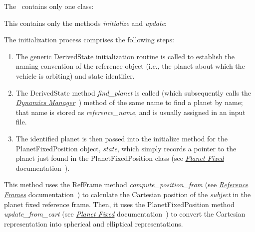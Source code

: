 The \PlanetaryDesc\ contains only one class:
\begin{itemize}

This contains only the methods \textit{initialize} and \textit{update}:
\begin{enumerate}
The initialization process comprises the following steps:
\begin{enumerate}
\item{} The generic DerivedState initialization routine is called to establish the naming convention of the reference object (i.e., the planet about which the vehicle is orbiting) and state identifier.
\item{} The DerivedState method \textit{find\_planet} is called (which subsequently calls the  \href{file:\JEODHOME/models/dynamics/dyn_manager/docs/dyn_manager.pdf}{\em Dynamics Manager}~\cite{dynenv:DYNMANAGER}) method of the same name to find a planet by name; that name is stored as \textit{reference\_name}, and is usually assigned in an input file.
\item{} The identified planet is then passed into the initialize method for the PlanetFixedPosition object, \textit{state}, which simply records a pointer to the planet just found in the PlanetFixedPosition class (see \href{file:\JEODHOME/models/utils/planet\_fixed/docs/planet\_fixed.pdf}{\em Planet Fixed} documentation~\cite{dynenv:PLANETFIXED}).
\end{enumerate}

This method uses the RefFrame method \textit{compute\_position\_from} (see \href{file:\JEODHOME/models/utils/ref\_frames/docs/ref\_frames.pdf}{\em Reference Frames} documentation~\cite{dynenv:REFFRAMES}) to calculate the Cartesian position of the \textit{subject} in the planet fixed reference frame.  Then, it uses the PlanetFixedPosition method \textit{update\_from\_cart} 
(see \href{file:\JEODHOME/models/utils/planet\_fixed/docs/planet\_fixed.pdf}{\em Planet Fixed} documentation~\cite{dynenv:PLANETFIXED}) 
to convert the Cartesian representation into spherical and elliptical representations.

\end{enumerate}
\end{itemize}
